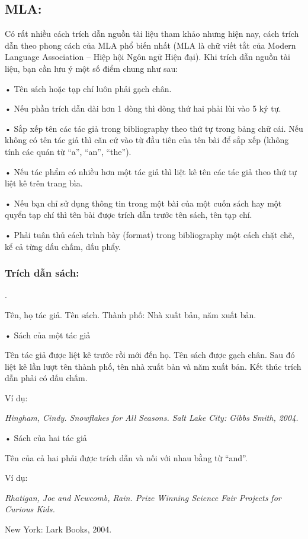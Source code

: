 \documentclass{hcmutarticle}
\begin{document}
\subsection{MLA:}
 Có rất nhiều cách trích dẫn nguồn tài liệu tham khảo nhưng hiện nay, cách trích dẫn theo phong cách của MLA phổ biến nhất (MLA là chữ viết tắt của Modern Language Association – Hiệp hội Ngôn ngữ Hiện đại). Khi trích dẫn nguồn tài liệu, bạn cần lưu ý một số điểm chung như sau:
 

•	Tên sách hoặc tạp chí luôn phải gạch chân.

•	Nếu phần trích dẫn dài hơn 1 dòng thì dòng thứ hai phải lùi vào 5 ký tự.

•	Sắp xếp tên các tác giả trong bibliography theo thứ tự trong bảng chữ cái. Nếu không có tên tác giả thì căn cứ vào từ đầu tiên của tên bài để sắp xếp (không tính các quán từ “a”, “an”, “the”).

•	Nếu tác phẩm có nhiều hơn một tác giả thì liệt kê tên các tác giả theo thứ tự liệt kê trên trang bìa.

•	Nếu bạn chỉ sử dụng thông tin trong một bài của một cuốn sách hay một quyển tạp chí thì tên bài được trích dẫn trước tên sách, tên tạp chí.

•	 Phải tuân thủ cách trình bày (format) trong bibliography một cách chặt chẽ, kể cả từng dấu chấm, dấu phẩy. 


\subsubsection{Trích dẫn sách:}.

 Tên, họ tác giả. Tên sách. Thành phố: Nhà xuất bản, năm xuất bản.

•	Sách của một tác giả

Tên tác giả được liệt kê trước rồi mới đến họ. Tên sách được gạch chân. Sau đó liệt kê lần lượt tên thành phố, tên nhà xuất bản và năm xuất bản. Kết thúc trích dẫn phải có dấu chấm.

Ví dụ:

{\em Hingham, Cindy. Snowflakes for All Seasons. Salt Lake City: Gibbs Smith, 2004.}

•	Sách của hai tác giả

Tên của cả hai phải được trích dẫn và nối với nhau bằng từ “and”.

Ví dụ:

{\em Rhatigan, Joe and Newcomb, Rain. Prize Winning Science Fair Projects for Curious Kids.

New York: Lark Books, 2004.}
\end{document}
